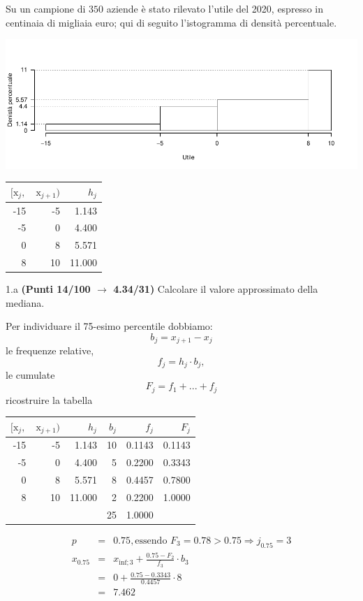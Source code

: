 \documentclass[
  11pt,
]{book}
\theoremstyle{mytheoremstyle}
\theoremstyle{mydefstyle}
\newenvironment{sol}
  {
  \begin{tcolorbox}[enhanced,breakable,arc=0.1mm,boxrule=1pt,colback=white,colframe=iblue,
  title=\bf \fontfamily{lmss}\selectfont \hspace{.5 cm} Soluzione,drop fuzzy shadow]

}{
\end{tcolorbox}
  }
\begin{document}
Su un campione di \(350\) aziende è stato rilevato l'utile del 2020, espresso in centinaia di migliaia euro;
qui di seguito l'istogramma di densità percentuale.

\begin{center}\includegraphics{Esami_passati_con_soluzioni_files/figure-latex/2021-41-1} \end{center}

\begin{table}[H]
\centering
\begin{tabular}{rrr}
\toprule
$[\text{x}_j,$ & $\text{x}_{j+1})$ & $h_j$\\
\midrule
-15 & -5 & 1.143\\
-5 & 0 & 4.400\\
0 & 8 & 5.571\\
8 & 10 & 11.000\\
\bottomrule
\end{tabular}
\end{table}

1.a \textbf{(Punti 14/100 \(\rightarrow\) 4.34/31)} Calcolare il valore approssimato della mediana.

\begin{sol}
Per individuare il 75-esimo percentile dobbiamo:
\[
b_j=x_{j+1}-x_{j}
\]
le frequenze relative,
\[
f_j=h_j\cdot b_j,
\]
le cumulate
\[
F_j=f_1+...+f_j
\]
ricostruire la tabella

\begin{table}[H]
\centering
\begin{tabular}{rrrrrr}
\toprule
$[\text{x}_j,$ & $\text{x}_{j+1})$ & $h_j$ & $b_j$ & $f_j$ & $F_j$\\
\midrule
-15 & -5 & 1.143 & 10 & 0.1143 & 0.1143\\
-5 & 0 & 4.400 & 5 & 0.2200 & 0.3343\\
0 & 8 & 5.571 & 8 & 0.4457 & 0.7800\\
8 & 10 & 11.000 & 2 & 0.2200 & 1.0000\\
 &  &  & 25 & 1.0000 & \\
\bottomrule
\end{tabular}
\end{table}

\begin{eqnarray*}
  p &=&  0.75 , \text{essendo }F_{ 3 }= 0.78  > 0.75  \Rightarrow j_{ 0.75 }= 3 \\
  x_{ 0.75 } &=& x_{\text{inf}; 3 } + \frac{ { 0.75 } - F_{ 2 }} {f_{ 3 }} \cdot b_{ 3 } \\
            &=&  0  + \frac {{ 0.75 } -  0.3343 } { 0.4457 } \cdot  8  \\
            &=&  7.462 
\end{eqnarray*}

\end{sol}
\end{document}

